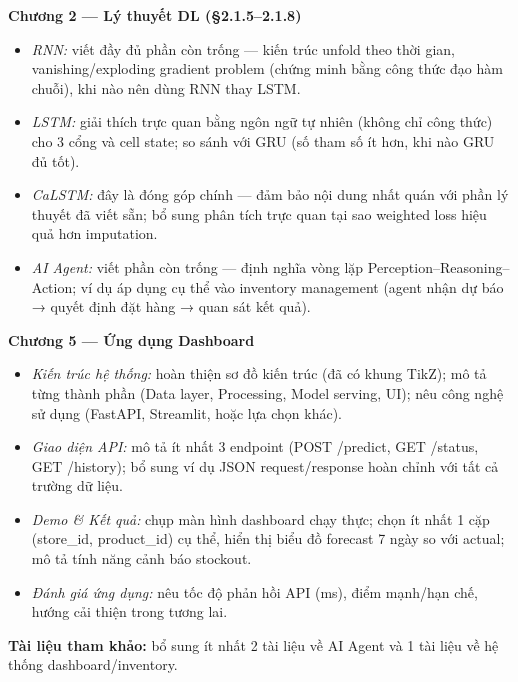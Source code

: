 \documentclass[12pt,a4paper]{report}
\newcommand{\ownerNK}{\colorbox{blue!15}{\textbf{[NK] Nam Khánh}}}
\begin{document}
\bigskip

\begin{tcolorbox}[colback=blue!4, colframe=blue!50!black,
    title=\bfseries \ownerNK\ — Nhiệm vụ chi tiết]

\textbf{Chương 2 — Lý thuyết DL (§2.1.5–2.1.8)}
\begin{itemize}[leftmargin=1.5em, itemsep=1pt]
    \item[\S2.1.5] \textit{RNN:} viết đầy đủ phần còn trống --- kiến trúc unfold theo thời gian, vanishing/exploding gradient problem (chứng minh bằng công thức đạo hàm chuỗi), khi nào nên dùng RNN thay LSTM.
    \item[\S2.1.6] \textit{LSTM:} giải thích trực quan bằng ngôn ngữ tự nhiên (không chỉ công thức) cho 3 cổng và cell state; so sánh với GRU (số tham số ít hơn, khi nào GRU đủ tốt).
    \item[\S2.1.7] \textit{CaLSTM:} đây là đóng góp chính --- đảm bảo nội dung nhất quán với phần lý thuyết đã viết sẵn; bổ sung phân tích trực quan tại sao weighted loss hiệu quả hơn imputation.
    \item[\S2.1.8] \textit{AI Agent:} viết phần còn trống --- định nghĩa vòng lặp Perception–Reasoning–Action; ví dụ áp dụng cụ thể vào inventory management (agent nhận dự báo → quyết định đặt hàng → quan sát kết quả).
\end{itemize}

\medskip
\textbf{Chương 5 — Ứng dụng Dashboard}
\begin{itemize}[leftmargin=1.5em, itemsep=1pt]
    \item[\S5.1] \textit{Kiến trúc hệ thống:} hoàn thiện sơ đồ kiến trúc (đã có khung TikZ); mô tả từng thành phần (Data layer, Processing, Model serving, UI); nêu công nghệ sử dụng (FastAPI, Streamlit, hoặc lựa chọn khác).
    \item[\S5.2] \textit{Giao diện API:} mô tả ít nhất 3 endpoint (POST /predict, GET /status, GET /history); bổ sung ví dụ JSON request/response hoàn chỉnh với tất cả trường dữ liệu.
    \item[\S5.3] \textit{Demo \& Kết quả:} chụp màn hình dashboard chạy thực; chọn ít nhất 1 cặp (store\_id, product\_id) cụ thể, hiển thị biểu đồ forecast 7 ngày so với actual; mô tả tính năng cảnh báo stockout.
    \item[\S5.4] \textit{Đánh giá ứng dụng:} nêu tốc độ phản hồi API (ms), điểm mạnh/hạn chế, hướng cải thiện trong tương lai.
\end{itemize}

\medskip
\textbf{Tài liệu tham khảo:} bổ sung ít nhất 2 tài liệu về AI Agent và 1 tài liệu về hệ thống dashboard/inventory.

\end{tcolorbox}
\end{document}
